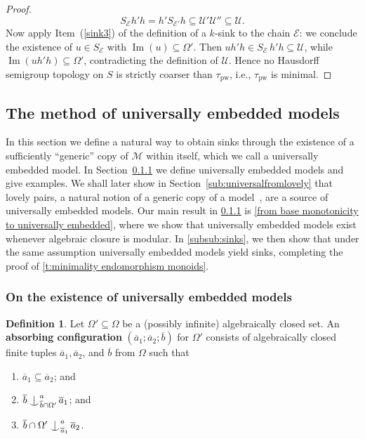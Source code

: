 \documentclass{article}
\theoremstyle{remark}
\theoremstyle{definition}
\newtheorem{definition}[theorem]{Definition}
\newcommand{\M}[0]{\mathcal{M}}
\newcommand{\U}[0]{\mathbb{U}}
\newcommand{\nn}[0]{S}%
\renewcommand{\U}[0]{\mathcal{U}}
\DeclareMathOperator{\im}{Im}
\newcommand{\pw}[0]{\tau_{\mathrm{pw}}}
\newcommand{\E}[0]{\mathcal{E}}
\def\Ind#1#2{#1\setbox0=\hbox{$#1x$}\kern\wd0\hbox to 0pt{\hss$#1\mid$\hss}
	\lower.9\ht0\hbox to 0pt{\hss$#1\smile$\hss}\kern\wd0}
\def\ind{\mathop{\mathpalette\Ind{}}}
\begin{document}
{{{{{\begin{proof}
      \begin{equation*}
        \nn_{\E}h'h=h'\nn_{\E'}h\subseteq\U'\U''\subseteq\U.
      \end{equation*}
      Now apply Item~(\ref{sink3}) of the definition of a $k$-sink {to the chain $\E$}: we conclude the existence of $u\in\nn_{\E}$ with $\im(u)\subseteq \Omega'$. 
      { Then   $u h' h \in \nn_{\E}\, h' h \subseteq \U$, while
  $\im(u h' h) \subseteq \Omega'$, contradicting the
  definition of $\U$. Hence no Hausdorff semigroup topology on $S$ is strictly
  coarser than $\pw$, i.e., $\pw$ is minimal.}
  \end{proof}


 \subsection{{The method of universally embedded models}}

  In this section we define a natural way to obtain sinks through the existence of a sufficiently ``generic'' copy of $\M$ within itself, which we  call a universally embedded model. In Section~\ref{subsub:existence} we define universally embedded models and give examples. {We shall later show in Section~\ref{sub:universalfromlovely} that lovely pairs, a natural notion of a generic copy of a model~\cite{ben2003lovely}, are a source of universally embedded models.} 
Our main result in \cref{subsub:existence} is \cref{from base monotonicity to universally embedded}, where we show that
universally embedded models exist whenever {algebraic closure is modular.} In \cref{subsub:sinks}, we then show that under the same assumption universally embedded models yield sinks, completing the proof of \cref{t:minimality endomorphism monoids}.
  
  \subsubsection{On the existence of universally embedded models}\label{subsub:existence}
 \begin{definition}\label{def: absorbing configuration} Let $\Omega'\subseteq\Omega$ be a (possibly infinite) algebraically closed set. An \textbf{absorbing configuration} $(\overline{a}_1; \overline{a}_2; \overline{b})$ for $\Omega'$ consists of algebraically closed finite tuples $\overline{a}_1, \overline{a}_2$, and $\overline{b}$ from $\Omega$ such that 
\begin{enumerate}[label=(\alph*)]
\item\label{p1} $\overline{a}_1\subseteq \overline{a}_2$; and
          \item \label{p3}$\overline{b}\ind^{a}_{\overline{b}\cap\Omega'} \overline{a}_1$; and
          \item \label{p4}$\overline{b}\cap\Omega'\ind^{a}_{\overline{a}_1} \overline{a}_2$.
\end{enumerate}
 \end{definition}

}}}}}
\end{document}
